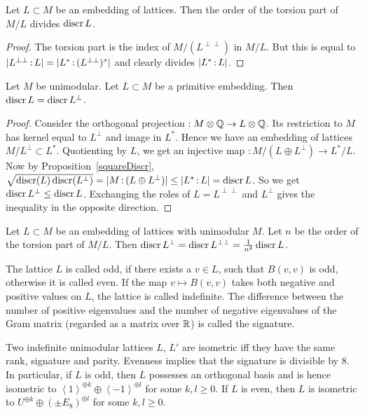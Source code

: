 \begin{proposition}\label{TorsionQuotient} Let $L\subset M$ be an embedding of lattices. Then the order of the torsion part of $M/L$ 
divides $\operatorname{discr} L$.
\end{proposition}
\begin{proof}
The torsion part is the index of $M/( L^{\perp\perp})$ in $M/L$. But this is equal to $|L^{\perp\perp}\,{:}\, L| = |L^* \,{:}\, (L^{\perp\perp})^*|$ and clearly divides $|L^*\,{:}\, L|$.
\end{proof}
\begin{proposition}\label{discrOrthPrim}
Let $M$ be unimodular. Let $L\subset M$ be a primitive embedding. Then $\operatorname{discr} L = \operatorname{discr} L^\perp$.
\end{proposition}
\begin{proof}
Consider the orthogonal projection $ : M\otimes\mathbb{Q} \rightarrow L\otimes \mathbb{Q}$. Its restriction to $M$ has kernel equal to $L^\perp$ and image in $L^*$. Hence we have an embedding of lattices $M/L^\perp \subset L^*$. Quotienting by $L$, we get an injective map $: M/(L\oplus L^\perp) \rightarrow L^*/L$. 
Now by Proposition~\ref{squareDiscr}, $\sqrt{\operatorname{discr}(L) \operatorname{discr} (L^\perp)} =|M \,{:}\, (L\oplus L^\perp)| \leq |L^*\,{:}\, L| = \operatorname{discr} L$. So we get $\operatorname{discr} L^\perp \leq \operatorname{discr} L$. Exchanging the roles of $L=L^{\perp\perp}$ and $L^\perp$ gives the inequality in the opposite direction.
\end{proof}
\begin{corollary}\label{latticeCor}
Let $L\subset M$ be an embedding of lattices with unimodular $M$. Let $n$ be the order of the torsion part of $M/L$. Then $\operatorname{discr} L^\perp =\operatorname{discr} L^{\perp\perp} = \frac{1}{n^2}\operatorname{discr} L$.
\end{corollary}
The lattice $L$ is called odd, if there exists a $v\in L$, such that $B(v,v)$ is odd, otherwise it is called even. 
If the map $v \mapsto B(v,v)$ takes both negative and positive values on $L$, the lattice is called indefinite. 
The difference between the number of positive eigenvalues and the number of negative eigenvalues of the Gram matrix (regarded as a matrix over $\mathbb{R}$) is called the signature.
\begin{theorem}\cite[Chap. II]{Milnor}
Two indefinite unimodular lattices $L$, $L'$ are isometric iff they have the same rank, signature and parity. Evenness implies that the signature is divisible by 8. 
In particular, if $L$ is odd, then $L$ possesses an orthogonal basis and is hence isometric to $\left<1\right>^{\oplus k}\oplus\left<-1\right>^{\oplus l}$ for some $k,l\geq 0$. If $L$ is even, then $L$ is isometric to $U^{\oplus k}\oplus (\pm E_8)^{\oplus l}$ for some $k,l\geq 0$.
\end{theorem}

